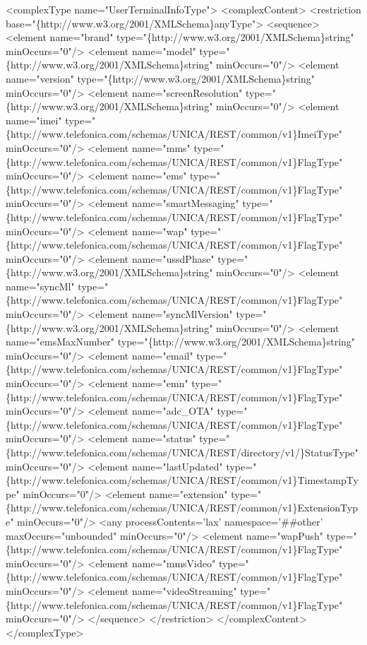 \begin{DoxyPre}
 <complexType name="UserTerminalInfoType">
   <complexContent>
     <restriction base="\{http://www.w3.org/2001/XMLSchema\}anyType">
       <sequence>
         <element name="brand" type="\{http://www.w3.org/2001/XMLSchema\}string" minOccurs="0"/>
         <element name="model" type="\{http://www.w3.org/2001/XMLSchema\}string" minOccurs="0"/>
         <element name="version" type="\{http://www.w3.org/2001/XMLSchema\}string" minOccurs="0"/>
         <element name="screenResolution" type="\{http://www.w3.org/2001/XMLSchema\}string" minOccurs="0"/>
         <element name="imei" type="\{http://www.telefonica.com/schemas/UNICA/REST/common/v1\}ImeiType" minOccurs="0"/>
         <element name="mms" type="\{http://www.telefonica.com/schemas/UNICA/REST/common/v1\}FlagType" minOccurs="0"/>
         <element name="ems" type="\{http://www.telefonica.com/schemas/UNICA/REST/common/v1\}FlagType" minOccurs="0"/>
         <element name="smartMessaging" type="\{http://www.telefonica.com/schemas/UNICA/REST/common/v1\}FlagType" minOccurs="0"/>
         <element name="wap" type="\{http://www.telefonica.com/schemas/UNICA/REST/common/v1\}FlagType" minOccurs="0"/>
         <element name="ussdPhase" type="\{http://www.w3.org/2001/XMLSchema\}string" minOccurs="0"/>
         <element name="syncMl" type="\{http://www.telefonica.com/schemas/UNICA/REST/common/v1\}FlagType" minOccurs="0"/>
         <element name="syncMlVersion" type="\{http://www.w3.org/2001/XMLSchema\}string" minOccurs="0"/>
         <element name="emsMaxNumber" type="\{http://www.w3.org/2001/XMLSchema\}string" minOccurs="0"/>
         <element name="email" type="\{http://www.telefonica.com/schemas/UNICA/REST/common/v1\}FlagType" minOccurs="0"/>
         <element name="emn" type="\{http://www.telefonica.com/schemas/UNICA/REST/common/v1\}FlagType" minOccurs="0"/>
         <element name="adc\_OTA" type="\{http://www.telefonica.com/schemas/UNICA/REST/common/v1\}FlagType" minOccurs="0"/>
         <element name="status" type="\{http://www.telefonica.com/schemas/UNICA/REST/directory/v1/\}StatusType" minOccurs="0"/>
         <element name="lastUpdated" type="\{http://www.telefonica.com/schemas/UNICA/REST/common/v1\}TimestampType" minOccurs="0"/>
         <element name="extension" type="\{http://www.telefonica.com/schemas/UNICA/REST/common/v1\}ExtensionType" minOccurs="0"/>
         <any processContents='lax' namespace='\##other' maxOccurs="unbounded" minOccurs="0"/>
         <element name="wapPush" type="\{http://www.telefonica.com/schemas/UNICA/REST/common/v1\}FlagType" minOccurs="0"/>
         <element name="mmsVideo" type="\{http://www.telefonica.com/schemas/UNICA/REST/common/v1\}FlagType" minOccurs="0"/>
         <element name="videoStreaming" type="\{http://www.telefonica.com/schemas/UNICA/REST/common/v1\}FlagType" minOccurs="0"/>
       </sequence>
     </restriction>
   </complexContent>
 </complexType>
 \end{DoxyPre}
 

